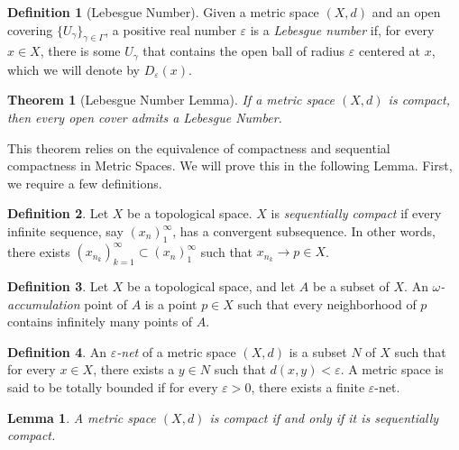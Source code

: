 \documentclass[openany, amssymb, psamsfonts]{amsart}
\newtheorem{thm}{Theorem}[section]
\newtheorem{lem}{Lemma}[section]
\theoremstyle{definition}
\newtheorem{defn}{Definition}[section]
\numberwithin{equation}{section}
\begin{document}
\begin{defn}[Lebesgue Number]
  Given a metric space $(X,d)$ and an open covering $\{U_\gamma\}_{\gamma \in \Gamma}$, a positive real number $\varepsilon$ is a \emph{Lebesgue number} if, for every $x \in X$, there is some $U_\gamma$ that contains the open ball of radius $\varepsilon$ centered at $x$, which we will denote by $D_\varepsilon(x)$.
\end{defn}
\begin{thm}[Lebesgue Number Lemma] \label{thm:1.2}
If a metric space $(X,d)$ is compact, then every open cover admits a Lebesgue Number.
\end{thm}
This theorem relies on the equivalence of compactness and sequential compactness in Metric Spaces. We will prove this in the following Lemma. First, we require a few definitions. 
\begin{defn}
  Let $X$ be a topological space. $X$ is \emph{sequentially compact} if every infinite sequence, say $(x_n)_1^\infty$, has a convergent subsequence. In other words, there exists $(x_{n_k})_{k=1}^\infty\subset(x_n)_1^\infty$ such that $x_{n_k} \to p \in X$.
\end{defn}
\begin{defn}
  Let $X$ be a topological space, and let $A$ be a subset of $X$. An \emph{$\omega$-accumulation} point of $A$ is a point $p \in X$ such that every neighborhood of $p$ contains infinitely many points of $A$.
\end{defn}
\begin{defn}
  An \emph{$\varepsilon$-net} of a metric space $(X,d)$ is a subset $N$ of $X$ such that for every $x \in X$, there exists a $y \in N$ such that $d(x,y) < \varepsilon$. A metric space is said to be totally bounded if for every $\varepsilon > 0$, there exists a finite $\varepsilon$-net.
\end{defn}
\begin{lem} \label{lem:1.3}
  A metric space $(X,d)$ is compact if and only if it is sequentially compact.
\end{lem}
\end{document}
